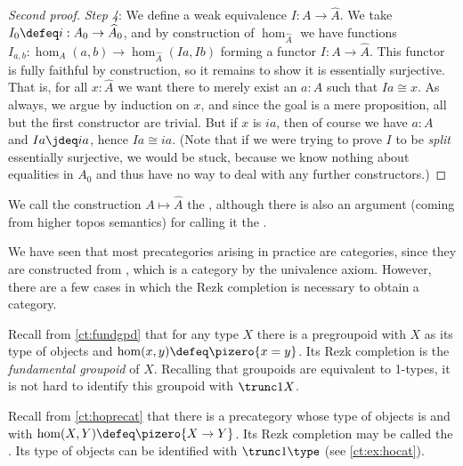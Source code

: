 \begin{proof}[Second proof]
  \mentalpause

  \emph{Step 4}: We define a weak equivalence $I:A \to \widehat A$.
  We take $I_0 \defeq i : A_0 \to \widehat A_0$, and by construction of $\hom_{\widehat A}$ we have functions $I_{a,b}:\hom_A(a,b) \to \hom_{\widehat A}(Ia,Ib)$ forming a functor $I:A \to \widehat A$.
  This functor is fully faithful by construction, so it remains to show it is essentially surjective.
  That is, for all $x:\widehat A$ we want there to merely exist an $a:A$ such that $Ia\cong x$.
  As always, we argue by induction on $x$, and since the goal is a mere proposition, all but the first constructor are trivial.
  But if $x$ is $ia$, then of course we have $a:A$ and $Ia\jdeq ia$, hence $Ia \cong ia$.
  (Note that if we were trying to prove $I$ to be \emph{split} essentially surjective, we would be stuck, because we know nothing about equalities in $A_0$ and thus have no way to deal with any further constructors.)
\end{proof}

We call the construction $A\mapsto \widehat A$ the ,
although there is also an argument (coming from higher topos semantics)
%
for calling it the .
%
%

We have seen that most precategories arising in practice are categories, since they are constructed from \uset, which is a category by the univalence axiom.
However, there are a few cases in which the Rezk completion is necessary to obtain a category.

\begin{eg}\label{ct:rezk-fundgpd-trunc1}
  Recall from \cref{ct:fundgpd} that for any type $X$ there is a pregroupoid with $X$ as its type of objects and $\hom(x,y) \defeq \pizero{x=y}$.
  Its Rezk completion is the \emph{fundamental groupoid} of $X$.
  Recalling that group\-oids are equivalent to 1-types, it is not hard to identify this groupoid with $\trunc1X$.
\end{eg}

\begin{eg}\label{ct:hocat}
  Recall from \cref{ct:hoprecat} that there is a precategory whose type of objects is \type and with $\hom(X,Y) \defeq \pizero{X\to Y}$.
  Its Rezk completion may be called the .
  Its type of objects can be identified with $\trunc1\type$ (see \cref{ct:ex:hocat}).
\end{eg}

